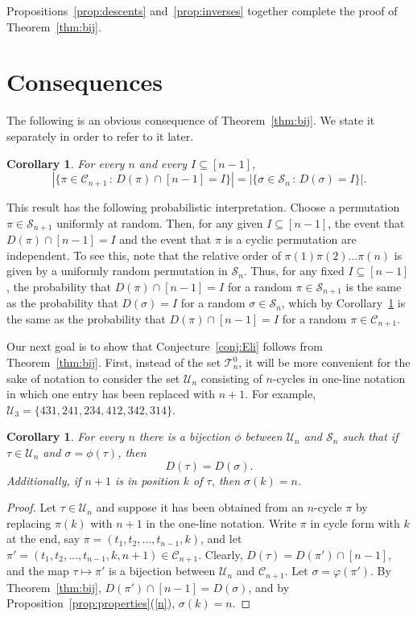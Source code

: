 \documentclass[11pt]{amsart}
\newtheorem{corollary}[theorem]{Corollary}
\renewcommand\S{\mathcal S}
\newcommand\C{\mathcal C}
\newcommand\T{{\mathcal T}}
\newcommand\U{{\mathcal U}}
\newcommand\bij{\varphi}
\newcommand\biju{\phi}
\begin{document}
Propositions~\ref{prop:descents} and~\ref{prop:inverses} together complete the proof of Theorem~\ref{thm:bij}.


\section{Consequences}\label{sec:consequences}

The following is an obvious consequence of Theorem~\ref{thm:bij}. We state it separately in order to refer to it later.

\begin{corollary}\label{cor:cycles} For every $n$ and every $I\subseteq[n-1]$,
$$|\{\pi\in\C_{n+1}\,:\,D(\pi)\cap[n-1]=I\}|=|\{\sigma\in\S_n\,:\,D(\sigma)=I\}|.$$
\end{corollary}

This result has the following probabilistic interpretation. Choose a permutation $\pi\in\S_{n+1}$ uniformly at random. Then, for any given $I\subseteq[n-1]$, the event that $D(\pi)\cap[n-1]=I$
and the event that $\pi$ is a cyclic permutation are independent. To see this, note that the relative order of $\pi(1)\pi(2)\dots\pi(n)$ is given by a uniformly random permutation in $\S_n$. Thus,
for any fixed $I\subseteq[n-1]$, the probability that $D(\pi)\cap[n-1]=I$ for a random $\pi\in\S_{n+1}$ is the same as the probability that $D(\sigma)=I$ for a random $\sigma\in\S_n$, which by Corollary~\ref{cor:cycles}
is the same as the probability that $D(\pi)\cap[n-1]=I$ for a random $\pi\in\C_{n+1}$.


Our next goal is to show that Conjecture~\ref{conj:Eli} follows from Theorem~\ref{thm:bij}.
First, instead of the set $\T^0_n$, it will be more convenient for the sake of notation to consider the set $\U_n$
consisting of $n$-cycles in one-line notation in which one entry has been replaced with $n+1$. For example, $\U_3=\{431,241,234,412,342,314\}$.

\begin{corollary}\label{cor:biju} For every $n$ there is a bijection $\biju$ between $\U_{n}$ and $\S_n$ such that if $\tau\in\U_n$ and $\sigma=\biju(\tau)$, then
$$D(\tau)=D(\sigma).$$
Additionally, if $n+1$ is in position $k$ of $\tau$, then $\sigma(k)=n$.
\end{corollary}

\begin{proof}
Let $\tau\in\U_n$ and suppose it has been obtained from an $n$-cycle $\pi$ by replacing $\pi(k)$ with $n+1$ in the one-line notation. Write $\pi$ in cycle form with $k$ at the end,
say $\pi=(t_1,t_2,\dots,t_{n-1},k)$, and let $\pi'=(t_1,t_2,\dots,t_{n-1},k,n+1)\in\C_{n+1}$. Clearly, $D(\tau)=D(\pi')\cap[n-1]$, and the map $\tau\mapsto\pi'$ is a bijection between $\U_n$ and $\C_{n+1}$.
Let $\sigma=\bij(\pi')$. By Theorem~\ref{thm:bij}, $D(\pi')\cap[n-1]=D(\sigma)$, and by Proposition~\ref{prop:properties}(\ref{n}), $\sigma(k)=n$.
\end{proof}
\end{document}
